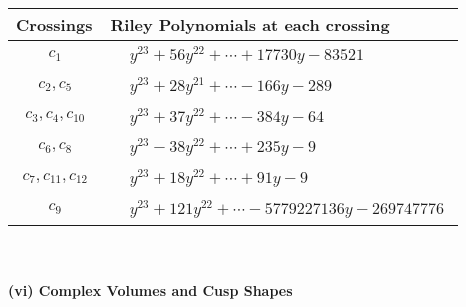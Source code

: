 \documentclass[1p]{elsarticle_modified}
\theoremstyle{definition}
\begin{document}
\begin{tabular}{m{50pt}|m{274pt}}
Crossings & \hspace{64pt}Riley Polynomials at each crossing \\
\hline $$\begin{aligned}c_{1}\end{aligned}$$&$\begin{aligned}
&y^{23}+56 y^{22}+\cdots+17730 y-83521
\end{aligned}$\\
\hline $$\begin{aligned}c_{2},c_{5}\end{aligned}$$&$\begin{aligned}
&y^{23}+28 y^{21}+\cdots-166 y-289
\end{aligned}$\\
\hline $$\begin{aligned}c_{3},c_{4},c_{10}\end{aligned}$$&$\begin{aligned}
&y^{23}+37 y^{22}+\cdots-384 y-64
\end{aligned}$\\
\hline $$\begin{aligned}c_{6},c_{8}\end{aligned}$$&$\begin{aligned}
&y^{23}-38 y^{22}+\cdots+235 y-9
\end{aligned}$\\
\hline $$\begin{aligned}c_{7},c_{11},c_{12}\end{aligned}$$&$\begin{aligned}
&y^{23}+18 y^{22}+\cdots+91 y-9
\end{aligned}$\\
\hline $$\begin{aligned}c_{9}\end{aligned}$$&$\begin{aligned}
&y^{23}+121 y^{22}+\cdots-5779227136 y-269747776
\end{aligned}$\\
\hline
\end{tabular}\\~\\
\newpage\flushleft \textbf{(vi) Complex Volumes and Cusp Shapes}
\end{document}
